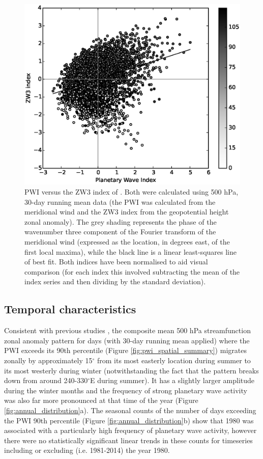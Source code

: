 \begin{figure}
\begin{center}
\includegraphics[width=0.7\columnwidth]{figures/zonalwaves/pwi-vs-zw3index_ERAInterim_500hPa_030day-runmean_native.eps}
\caption[PWI versus the ZW3 index of \citet{Raphael2004}]{\label{fig:metric_vs_zw3}
PWI versus the ZW3 index of \citet{Raphael2004}. Both were calculated using 500 hPa, 30-day running mean data (the PWI was calculated from the meridional wind and the ZW3 index from the geopotential height zonal anomaly). The grey shading represents the phase of the wavenumber three component of the Fourier transform of the meridional wind (expressed as the location, in degrees east, of the first local maxima), while the black line is a linear least-squares line of best fit. Both indices have been normalised to aid visual comparison (for each index this involved subtracting the mean of the index series and then dividing by the standard deviation).}
\end{center}
\end{figure}
    
\subsection{Temporal characteristics}

Consistent with previous studies \citep[e.g.][]{vanLoon1984,Mo1985}, the composite mean 500 hPa streamfunction zonal anomaly pattern for days (with 30-day running mean applied) where the PWI exceeds its 90th percentile (Figure \ref{fig:pwi_spatial_summary}) migrates zonally by approximately 15$^{\circ}$ from its most easterly location during summer to its most westerly during winter (notwithstanding the fact that the pattern breaks down from around 240-330$^{\circ}$E during summer). It has a slightly larger amplitude during the winter months and the frequency of strong planetary wave activity was also far more pronounced at that time of the year (Figure \ref{fig:annual_distribution}a). The seasonal counts of the number of days exceeding the PWI 90th percentile (Figure \ref{fig:annual_distribution}b) show that 1980 was associated with a particularly high frequency of planetary wave activity, however there were no statistically significant linear trends in these counts for timeseries including or excluding (i.e. 1981-2014) the year 1980.  

